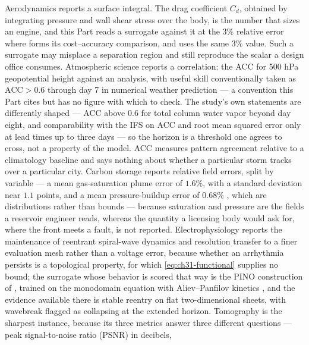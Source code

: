 Aerodynamics reports a surface integral. The drag coefficient $C_{d}$, obtained by integrating
pressure and wall shear stress over the body, is the number that sizes an engine, and this Part
reads a surrogate against it at the $3\%$ relative error where \cite{li2023geometry} forms its
cost--accuracy comparison, and 
uses the same $3\%$ value. Such a surrogate may misplace a separation region and still reproduce
the scalar a design office consumes. Atmospheric science reports a
correlation: the ACC for 500 hPa geopotential height against an analysis, with useful skill
conventionally taken as $\mathrm{ACC} > 0.6$ through day 7 in numerical weather prediction
--- a convention this Part cites but has no figure with which to check. The study's own statements are
differently shaped --- ACC above $0.6$ for total column water vapor beyond day eight, and
comparability with the IFS on ACC and root mean squared error only at lead times up to three days
\cite{pathak2022fourcastnet} --- so the horizon is a threshold one agrees to cross, not a property
of the model. ACC measures pattern agreement
relative to a climatology baseline and says nothing about whether a particular storm tracks over
a particular city. Carbon storage reports relative field errors,
split by variable --- a mean gas-saturation plume error of $1.6\%$, with a standard deviation near
$1.1$ points, and a mean pressure-buildup error of $0.68\%$ \cite{wen2022ufno}, which are
distributions rather than bounds --- because saturation and pressure are the fields a reservoir engineer reads,
whereas the quantity a licensing body would ask for, where the front meets a fault, is not reported.
Electrophysiology reports the maintenance of reentrant spiral-wave dynamics
and resolution transfer to a finer evaluation mesh rather than a voltage error, because whether an
arrhythmia persists is a topological property, for which
\eqref{eq:ch31-functional} supplies no bound; the surrogate whose behavior is scored that way is the
PINO construction \cite{li2021physics} of ,
trained on the monodomain equation with Aliev--Panfilov kinetics \cite{aliev1996simple}, and the
evidence available there is stable reentry on
flat two-dimensional sheets, with wavebreak flagged as collapsing at the extended
horizon. Tomography is the sharpest instance, because its
three metrics answer three different questions --- peak signal-to-noise ratio (PSNR) in decibels,

